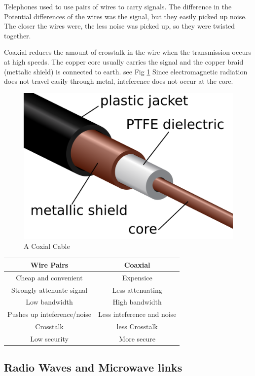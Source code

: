 \documentclass{scrbook}
\begin{document}
	Telephones used to use pairs of wires to carry signals. The difference in the Potential differences of the wires was the signal, but they easily picked up noise. The closer the wires were, the less noise was picked up, so they were twisted together.

	Coaxial reduces the amount of crosstalk in the wire when the transmission occurs at high speeds. The copper core usually carries the signal and the copper braid (mettalic shield) is connected to earth. see Fig \ref{coaxial} Since electromagnetic radiation does not travel easily through metal, inteference does not occur at the core.

	\begin{figure}[t]
		\label{coaxial}
		\caption{A Coxial Cable \cite{wikicomm:coax}}
		\includegraphics[width=\linewidth]{assets/coaxial.png}
	\end{figure}

	\begin{tabular}{| c | c |}
		\hline
		Wire Pairs & Coaxial \\
		\hline
		Cheap and convenient & Expensice \\
		Strongly attenuate signal & Less attenuating \\
		Low bandwidth & High bandwidth \\ 
		Pushes up inteference/noise & Less inteference and noise \\
		Crosstalk & less Crosstalk \\
		Low security & More secure \\
		\hline
	\end{tabular}

\subsection{Radio Waves and Microwave links}
\end{document}
